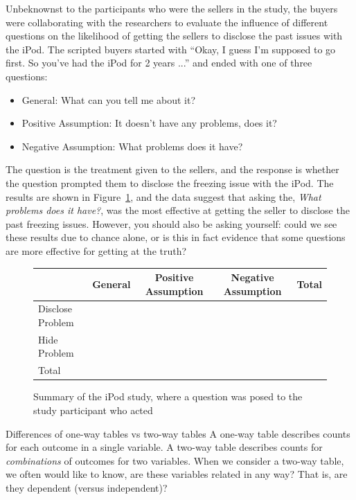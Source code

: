 Unbeknownst to the participants who were the sellers
in the study,
the buyers were collaborating with the researchers
to evaluate the influence of different questions
on the likelihood of getting the sellers to disclose
the past issues with the iPod.
The scripted buyers started with
``Okay, I guess I'm supposed to go first.
  So you've had the iPod for 2 years ...''
and ended with one of three questions:
\begin{itemize}
\item General: What can you tell me about it?
\item Positive Assumption: It doesn't have any problems, does it?
\item Negative Assumption: What problems does it have?
\end{itemize}
The question is the treatment given to the sellers,
and the response is whether the question prompted them
to disclose the freezing issue with the iPod.
The results are shown in Figure~\ref{ipod_ask_data_summary},
and the data suggest that asking the,
\emph{What problems does it have?},
was the most effective at getting the seller to disclose
the past freezing issues.
However, you should also be asking yourself:
could we see these results due to chance alone,
or is this in fact evidence that some questions
are more effective for getting at the truth?

\begin{figure}[ht]
\centering
\begin{tabular}{l ccc l}
  \hline
  & General & Positive Assumption &
      Negative Assumption & Total \\ 
  \hline
  Disclose Problem & \iPodAA{} &  \iPodAB{} &
      \iPodAC{} & \iPodAD{} \\ 
  Hide Problem &  \iPodBA{} &  \iPodBB{} &
      \iPodBC{} & \iPodBD{} \\ 
  \hline
  Total & \iPodDA{} & \iPodDB{} &
      \iPodDC{} & \iPodDD{} \\
  \hline
\end{tabular}
\caption{Summary of the iPod study, where a question was
  posed to the study participant who acted}
\label{ipod_ask_data_summary}
\end{figure}

\begin{onebox}{Differences of one-way tables vs two-way tables}
  A one-way table describes counts for each outcome in a single
  variable.
  A two-way table describes counts for \emph{combinations}
  of outcomes for two variables.
  When we consider a two-way table, we often would like to know,
  are these variables related in any way?
  That is, are they dependent (versus independent)?
\end{onebox}

